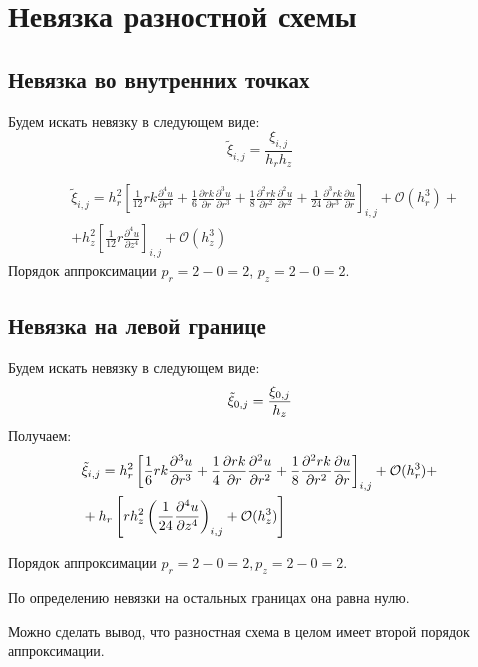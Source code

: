 \section{Невязка разностной схемы}

\subsection{Невязка во внутренних точках}

Будем искать невязку в следующем виде:
\[
  \tilde{\xi}_{i, j} = \frac{\xi_{i, j}}{h_r h_z}
\]

\begin{align*}
  &\tilde{\xi}_{i, j} = 
  h^2_r\left[ \frac{1}{12} r k \frac{\partial^4 u}{\partial r^4} + \frac{1}{6}\frac{\partial r k}{\partial r}\frac{\partial^3 u}{\partial r^3}
  + \frac{1}{8} \frac{\partial^2 r k}{\partial r^2}\frac{\partial^2 u}{\partial r^2}
  + \frac{1}{24} \frac{\partial^3 r k}{\partial r^3}\frac{\partial u}{\partial r} \right]_{i,j} + \mathcal{O}(h_r^3) + \\
  &+ h^2_z \left[
    \frac{1}{12} r \frac{\partial^4 u}{\partial z^4}
     \right]_{i, j} + \mathcal{O}(h_z^3)
\end{align*}
Порядок аппроксимации $p_r = 2 - 0 = 2 $, $ p_z = 2 - 0 = 2 $.

\subsection{Невязка на левой границе}

Будем искать невязку в следующем виде:
\[ \Tilde{\xi}_{0, j} = \frac{\xi_{0, j}}{h_z} \]
Получаем:
\begin{align*}
  &\Tilde{\xi}_{i, j} = 
  h^2_r \left[
  \frac{1}{6} rk \frac{\partial^3 u}{ \partial r^3} +
  \frac{1}{4} \frac{\partial rk}{ \partial r} \frac{\partial^2 u}{ \partial r^2} +
  \frac{1}{8} \frac{\partial^2 rk}{ \partial r^2} \frac{\partial u}{ \partial r}
  \right]_{i ,j} + \mathcal{O}(h^3_r) + \\
 & + h_r\left[ r h^2_z\left( 
  \frac{1}{24} \frac{\partial^4 u}{ \partial z^4}
  \right)_{i, j}
  + \mathcal{O}(h^3_z) \right]
\end{align*}

Порядок аппроксимации $ p_r = 2 - 0 = 2, p_z = 2 - 0 = 2 $.

По определению невязки на остальных границах она равна нулю.

Можно сделать вывод, что разностная схема в целом имеет второй порядок аппроксимации.

